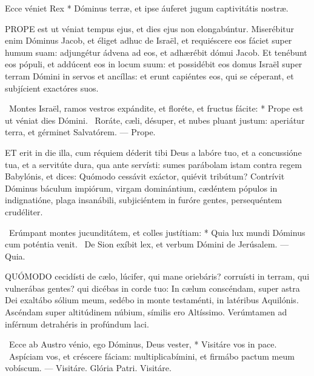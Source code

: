  Ecce véniet Rex * Dóminus terræ, et ipse áuferet jugum captivitátis nostræ.

\sectionornament




\lettrine[lines=2]{P}{ROPE} est ut véniat tempus ejus, et dies ejus non elongabúntur. Miserébitur enim Dóminus Jacob, et éliget adhuc de Israël, et requiéscere eos fáciet super humum suam: adjungétur ádvena ad eos, et adhærébit dómui Jacob. Et tenébunt eos pópuli, et addúcent eos in locum suum: et possidébit eos domus Israël super terram Dómini in servos et ancíllas: et erunt capiéntes eos, qui se céperant, et subjícient exactóres suos.

\R\ Montes Israël, ramos vestros expándite, et floréte, et fructus fácite: * Prope est ut véniat dies Dómini. \V\ Roráte, cæli, désuper, et nubes pluant justum: aperiátur terra, et gérminet Salvatórem. --- Prope.


\lettrine[lines=2]{E}{T} erit in die illa, cum réquiem déderit tibi Deus a labóre tuo, et a concussióne tua, et a servitúte dura, qua ante servísti: sumes parábolam istam contra regem Babylónis, et dices: Quómodo cessávit exáctor, quiévit tribútum? Contrívit Dóminus báculum impiórum, virgam dominántium, cædéntem pópulos in indignatióne, plaga insanábili, subjiciéntem in furóre gentes, persequéntem crudéliter.

\R\ Erúmpant montes jucunditátem, et colles justítiam: * Quia lux mundi Dóminus cum poténtia venit. \V\ De Sion exíbit lex, et verbum Dómini de Jerúsalem. --- Quia.


\lettrine[lines=2]{Q}{UÓMODO} cecidísti de cælo, lúcifer, qui mane oriebáris? corruísti in terram, qui vulnerábas gentes? qui dicébas in corde tuo: In cælum conscéndam, super astra Dei exaltábo sólium meum, sedébo in monte testaménti, in latéribus Aquilónis. Ascéndam super altitúdinem núbium, símilis ero Altíssimo. Verúmtamen ad inférnum detrahéris in profúndum laci.

\R\ Ecce ab Austro vénio, ego Dóminus, Deus vester, * Visitáre vos in pace. \V\ Aspíciam vos, et créscere fáciam: multiplicabímini, et firmábo pactum meum vobíscum. --- Visitáre. Glória Patri. Visitáre.

